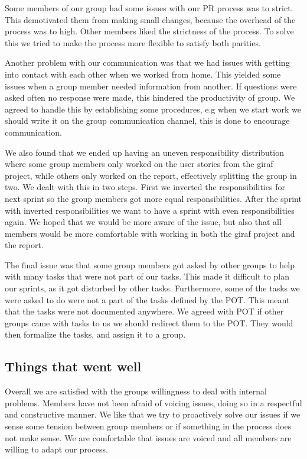 Some members of our group had some issues with our \gls{PR} process was to strict. This demotivated them from making small changes, because the overhead of the process was to high. Other members liked the strictness of the process. To solve this we tried to make the process more flexible to satisfy both parities.

Another problem with our communication was that we had issues with getting into contact with each other when we worked from home. This yielded some issues when a group member needed information from another. If questions were asked often no response were made, this hindered the productivity of group. We agreed to handle this by establishing some procedures, e.g when we start work we should write it on the group communication channel, this is done to encourage communication.

We also found that we ended up having an uneven responsibility distribution where some group members only worked on the user stories from the \gls{giraf} project, while others only worked on the report, effectively splitting the group in two. We dealt with this in two steps. First we inverted the responsibilities for next sprint so the group members got more equal responsibilities. After the sprint with inverted responsibilities we want to have a sprint with even responsibilities again. We hoped that we would be more aware of the issue, but also that all members would be more comfortable with working in both the \gls{giraf} project and the report.

The final issue was that some group members got asked by other groups to help with many tasks that were not part of our tasks. This made it difficult to plan our sprints, as it got disturbed by other tasks. Furthermore, some of the tasks we were asked to do were not a part of the tasks defined by the \gls{POT}. This meant that the tasks were not documented anywhere.
We agreed with \gls{POT} if other groups came with tasks to us we should redirect them to the \gls{POT}. They would then formalize the tasks, and assign it to a group.

\subsection{Things that went well}

Overall we are satisfied with the groups willingness to deal with internal problems. Members have not been afraid of voicing issues, doing so in a respectful and constructive manner. We like that we try to proactively solve our issues if we sense some tension between group members or if something in the process does not make sense. We are comfortable that issues are voiced and all members are willing to adapt our process. 